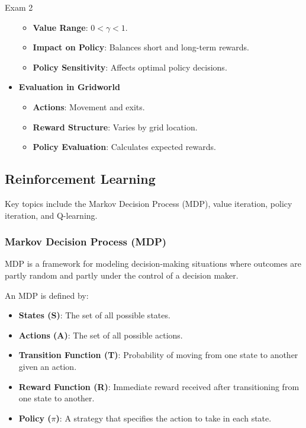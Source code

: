 \begin{examnotes}{Exam 2}
\begin{highlight}
\begin{itemize}
\begin{itemize}
                    \item \textbf{Value Range}: \(0 < \gamma < 1\).
                    \item \textbf{Impact on Policy}: Balances short and long-term rewards.
                    \item \textbf{Policy Sensitivity}: Affects optimal policy decisions.
                \end{itemize}
            \item \textbf{Evaluation in Gridworld}
                \begin{itemize}
                    \item \textbf{Actions}: Movement and exits.
                    \item \textbf{Reward Structure}: Varies by grid location.
                    \item \textbf{Policy Evaluation}: Calculates expected rewards.
                \end{itemize}
        \end{itemize}
    \end{highlight}

    \subsection*{Reinforcement Learning}

    Key topics include the Markov Decision Process (MDP), value iteration, policy iteration, and Q-learning.
    
    \subsubsection*{Markov Decision Process (MDP)}
    
    MDP is a framework for modeling decision-making situations where outcomes are partly random and partly under the control of a decision maker.
    
    \begin{highlight}
        An MDP is defined by:
        \begin{itemize}
            \item \textbf{States (S)}: The set of all possible states.
            \item \textbf{Actions (A)}: The set of all possible actions.
            \item \textbf{Transition Function (T)}: Probability of moving from one state to another given an action.
            \item \textbf{Reward Function (R)}: Immediate reward received after transitioning from one state to another.
            \item \textbf{Policy ($\pi$)}: A strategy that specifies the action to take in each state.
        \end{itemize}
    \end{highlight}
    

\end{examnotes}
